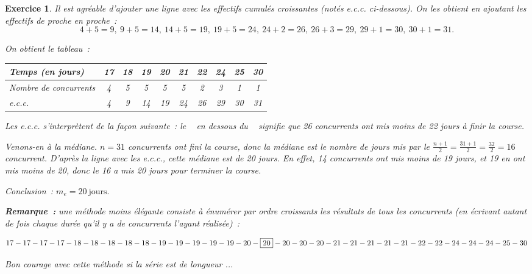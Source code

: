 \documentclass[10pt]{article}
\newtheorem{exo}{Exercice}
\begin{document}
\begin{exo}

Il est agréable d'ajouter une ligne avec les effectifs cumulés croissantes (notés e.c.c. ci-dessous). On les obtient en ajoutant les effectifs de proche en proche~:
\[4+5=9,~9+5=14,~14+5=19,~19+5=24,~24+2=26,~26+3=29,~29+1=30,~30+1=31.\]

On obtient le tableau~:

\begin{center}
\begin{tabular}{|l|c|c|c|c|c|c|c|c|c|}
\hline
Temps (en jours)&17&18&19&20&21&22&24&25&30\\
\hline
    Nombre de concurrents&4&5&5&5&5&2&3&1&1 \\ \hline
    e.c.c.&4&9&14&19&24&26&29&30&31\\
	\hline
   
\end{tabular}
\end{center}


\medskip

Les e.c.c. s'interprètent de la façon suivante~: le  \fg~{} en dessous du  \fg~{} signifie que 26 concurrents ont mis moins de 22 jours à finir la course.

\medskip

Venons-en à la médiane. $n=31$ concurrents ont fini la course, donc la médiane est le nombre de jours mis par le $\frac{n+1}{2}=\frac{31+1}{2}=\frac{32}{2}=16$ concurrent. D'après la ligne avec les e.c.c., cette médiane est de 20 jours. En effet, 14 concurrents ont mis moins de 19 jours, et 19 en ont mis moins de 20, donc le 16 a mis 20 jours pour terminer la course.

\medskip

Conclusion~: $m_e=20~\text{jours}.$

\medskip

\textbf{Remarque~:} une méthode moins élégante consiste à énumérer par ordre croissants les résultats de tous les concurrents (en écrivant autant de fois chaque durée qu'il y a de concurrents l'ayant réalisée)~:

\[17-17-17-17-18-18-18-18-18-19-19-19-19-19-20-\fbox{20}-20-20-20-21-21-21-21-21-22-22-24-24-24-25-30\]

Bon courage avec cette méthode si la série est de longueur ...


\end{exo}
\end{document}
